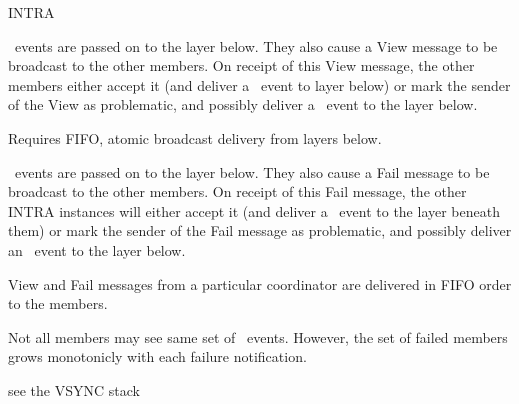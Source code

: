 \begin{Layer}{INTRA}
\begin{Properties}
\item
\DnView\ events are passed on to the layer below.  They also cause a View message to
be broadcast to the other members.  On receipt of this View message, the other
members either accept it (and deliver a \DnView\ event to layer below) or mark the
sender of the View as problematic, and possibly deliver a \DnSuspect\ event to the
layer below.
\item
Requires FIFO, atomic broadcast delivery from layers below.
\item
\DnFail\ events are passed on to the layer below.  They also cause a Fail
message to be broadcast to the other members.  On receipt of this Fail
message, the other INTRA instances will either accept it (and deliver a
\DnFail\ event to the layer beneath them) or mark the sender of the Fail
message as problematic, and possibly deliver an \DnSuspect\ event to the
layer below.
\item
View and Fail messages from a particular coordinator are delivered in FIFO
order to the members.
\item
Not all members may see same set of \UpFail\ events.  However, the set of
failed members grows monotonicly with each failure notification.
\end{Properties}

\begin{Sources}
\end{Sources}

\begin{GenEvent}
\genevent{\DnAck}
\genevent{\DnCast}
\genevent{\DnFail}
\genevent{\DnSuspect}
\genevent{\DnView}
\end{GenEvent}

\begin{Testing}
\item
see the VSYNC stack
\end{Testing}
\end{Layer}

